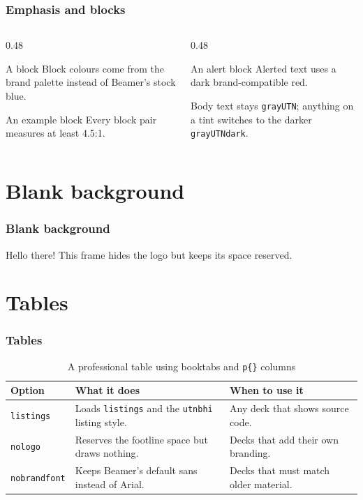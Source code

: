\documentclass[aspectratio=169]{beamer}
\begin{document}
\begin{frame}
  \frametitle{Emphasis and blocks}
  \begin{columns}[T]
    \begin{column}{0.48\textwidth}
      \begin{block}{A block}
        Block colours come from the brand palette instead of Beamer's stock
        blue.
      \end{block}
      \begin{exampleblock}{An example block}
        Every block pair measures at least 4.5:1.
      \end{exampleblock}
    \end{column}
    \begin{column}{0.48\textwidth}
      \begin{alertblock}{An alert block}
        \alert{Alerted text} uses a dark brand-compatible red.
      \end{alertblock}
      \vspace{1em}
      Body text stays \texttt{grayUTN}; anything on a tint switches to the
      darker \texttt{grayUTNdark}.
    \end{column}
  \end{columns}
\end{frame}

{
\utnbhinologo
\section{Blank background}
\begin{frame}
  \frametitle{Blank background}
  Hello there! This frame hides the logo but keeps its space reserved.
\end{frame}
}

\section{Tables}
\begin{frame}
  \frametitle{Tables}
  \small
  \begin{table}
    \centering
    \begin{tabular}{l p{} p{}}
      \toprule
      Option & What it does & When to use it \\
      \midrule
      \texttt{listings} & Loads \texttt{listings} and the \texttt{utnbhi}
        listing style. & Any deck that shows source code. \\
      \texttt{nologo} & Reserves the footline space but draws nothing. &
        Decks that add their own branding. \\
      \texttt{nobrandfont} & Keeps Beamer's default sans instead of Arial. &
        Decks that must match older material. \\
      \bottomrule
    \end{tabular}
    \caption{A professional table using booktabs and \texttt{p\{\}} columns}
  \end{table}
\end{frame}
\end{document}
